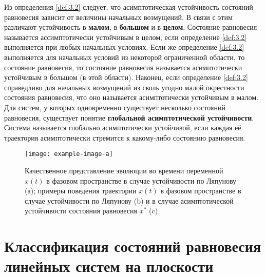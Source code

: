Из определения \ref{def:3.2} следует, что асимптотическая устойчивость состояний равновесия зависит от величины начальных возмущений. В связи с этим различают устойчивость в \textbf{малом}, в \textbf{большом} и в \textbf{целом}. Состояние равновесия называется ассимптотически устойчивым в целом, если определение \ref{def:3.2} выполняется при любых начальных условиях. Если же определение \ref{def:3.2} выполняется для начальных условий из некоторой ограниченной области, то состояние равновесия, то состояние равновесия называется асимптотически устойчивым в большом (в этой области). Наконец, если определение \ref{def:3.2} справедливо для начальных  возмущений из сколь угодно малой окрестности состояния равновесия, что оно называется асимптотически устойчивым в малом.
Для систем, у которых одновременно существует несколько состояний равновесия, существует понятие \textbf{ глобальной асимптотической устойчивости}. Система называется глобально асимптотически устойчивой, если каждая её траектория асимптотически  стремится к какому-либо состоянию равновесия.

\begin{figure}[h!]
        \centering
        \texttt{[image: example-image-a]}
        \label{fig:3.2}
        \caption{Качественное представление эволюции во времени переменной $x(t)$ в фазовом пространстве в случае устойчивости по Ляпунову (а); примеры поведения траектории $x(t)$ в фазовом пространстве в случае устойчивости по Ляпунову (b) и в случае асимптотической устойчивости состояния равновесия $x^*$ (c) }
\end{figure}

\section{Классификация состояний равновесия линейных систем на плоскости}%
\label{sub:3.2}

